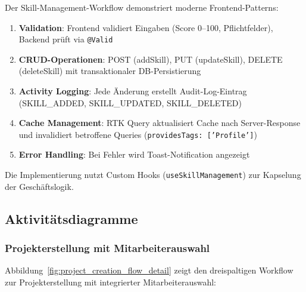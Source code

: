 Der Skill-Management-Workflow demonstriert moderne Frontend-Patterns:
\begin{enumerate}[noitemsep]
    \item \textbf{Validation}: Frontend validiert Eingaben (Score 0--100, Pflichtfelder), Backend pr\"uft via \texttt{@Valid}
    \item \textbf{CRUD-Operationen}: POST (addSkill), PUT (updateSkill), DELETE (deleteSkill) mit transaktionaler DB-Persistierung
    \item \textbf{Activity Logging}: Jede \"Anderung erstellt Audit-Log-Eintrag (SKILL\_ADDED, SKILL\_UPDATED, SKILL\_DELETED)
    \item \textbf{Cache Management}: RTK Query aktualisiert Cache nach Server-Response und invalidiert betroffene Queries (\texttt{providesTags: ['Profile']})
    \item \textbf{Error Handling}: Bei Fehler wird Toast-Notification angezeigt
\end{enumerate}

Die Implementierung nutzt Custom Hooks (\texttt{useSkillManagement}) zur Kapselung der Geschäftslogik.

\subsection{Aktivitätsdiagramme}

\subsubsection{Projekterstellung mit Mitarbeiterauswahl}

Abbildung~\ref{fig:project_creation_flow_detail} zeigt den dreispaltigen Workflow zur Projekterstellung mit integrierter Mitarbeiterauswahl:

